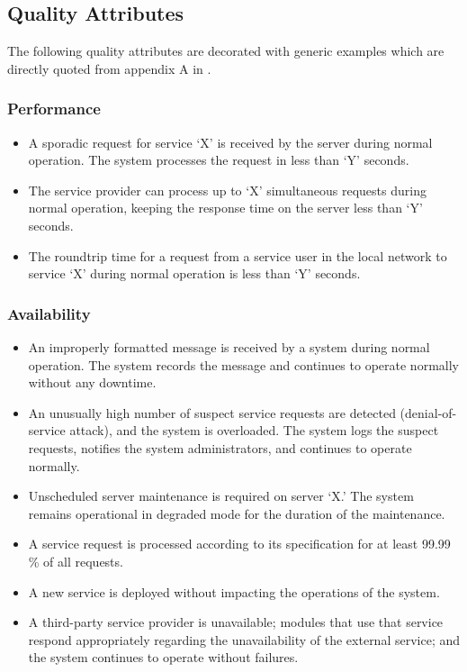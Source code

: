 \subsection{Quality Attributes}
\label{subseb:qualatt}
The following quality attributes are decorated with generic examples which are directly quoted from appendix A in \cite{Bianco2007EvaluatingArchitecture}. 
\subsubsection{Performance}
\begin{itemize}
    \item A sporadic request for service ‘X’ is received by the server during normal operation. The     system processes the request in less than ‘Y’ seconds. 
    \item The service provider can process up to ‘X’ simultaneous requests during normal operation, keeping the response time on the server less than ‘Y’ seconds.  
    \item The roundtrip time for a request from a service user in the local network to service ‘X’     during normal operation is less than ‘Y’ seconds. 
\end{itemize}

\subsubsection{Availability}
\begin{itemize}
    \item An improperly formatted message is received by a system during normal operation. The 
system records the message and continues to operate normally without any downtime. 
    \item An unusually high number of suspect service requests are detected (denial-of-service attack), and the system is overloaded. The system logs the suspect requests, notifies the system administrators, and continues to operate normally. 
    \item Unscheduled server maintenance is required on server ‘X.’ The system remains operational in degraded mode for the duration of the maintenance. 
    \item A service request is processed according to its specification for at least 99.99\,\% of all requests. 
    \item A new service is deployed without impacting the operations of the system. 
    \item A third-party service provider is unavailable; modules that use that service respond appropriately regarding the unavailability of the external service; and the system continues to operate without failures.
\end{itemize}

